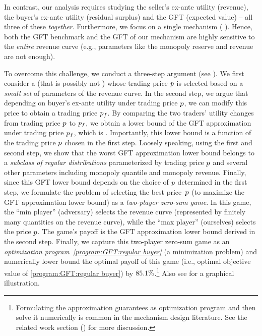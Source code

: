 In contrast, our analysis requires studying the seller's ex-ante utility (revenue), the buyer's ex-ante utility (residual surplus) and the GFT (expected value) -- all three of these \emph{together}. Furthermore, we focus on a single mechanism ({\ksfair} {\FixPrice}). Hence, both the GFT benchmark and the GFT of our mechanism are highly sensitive to the \emph{entire} revenue curve {(e.g., parameters like the monopoly reserve and revenue are not enough)}.

To overcome this challenge, we conduct a three-step argument (see ). We first consider a {\FixPrice} (that is possibly not {\ksfair})  whose trading price $p$ is selected based on a \emph{small set} of parameters of the revenue curve. 
In the second step, we argue that depending on buyer's ex-ante utility under trading price $p$, we can modify this price to obtain a {\ksfair} trading price $p_f$. By comparing the two traders' utility changes from trading price $p$ to $p_f$, we obtain a lower bound of the GFT approximation under trading price $p_f$, which is {\ksfair}. Importantly, this lower bound is a {function of the trading price $p$ chosen in the first step}. Loosely speaking, using the first and second step, we show that the worst GFT approximation lower bound belongs to a \emph{subclass of regular distributions} parameterized by trading price $p$ and several other parameters including monopoly quantile and monopoly revenue. Finally, since this GFT lower bound depends on the choice of $p$ determined in the first step, we formulate the problem of selecting the best price~$p$ (to maximize the GFT approximation lower bound) as a \emph{two-player zero-sum game}. In this game, the ``min player'' (adversary) selects the revenue curve (represented by finitely many quantities on the revenue curve), while the ``max player'' (ourselves) selects the price $p$. The game's payoff is the GFT approximation lower bound derived in the second step. Finally, we capture this two-player zero-sum game as an \emph{optimization program~\ref{program:GFT:regular buyer}} {(a minimization problem)} and numerically lower bound the optimal payoff of this game (i.e., optimal objective value of \ref{program:GFT:regular buyer}) by ${85.1\%}$.\footnote{Formulating the approximation guarantees as optimization program and then solve it numerically is common in the mechanism design literature. See the related work section () for more discussion.} Also see  for a graphical illustration. 


